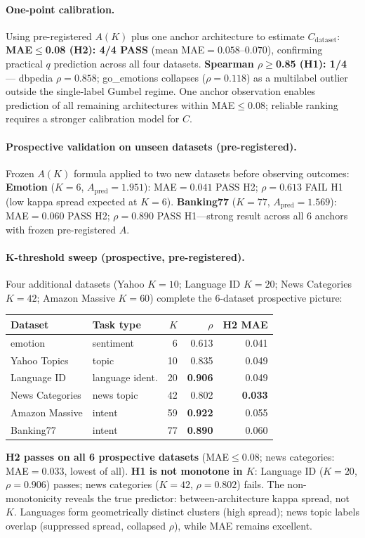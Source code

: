 \documentclass{article}
\begin{document}
\paragraph{One-point calibration.}
Using pre-registered $A(K)$ plus one anchor architecture to estimate $C_\mathrm{dataset}$:
\textbf{MAE$\leq$0.08 (H2): 4/4 PASS} (mean MAE$=0.058$--$0.070$), confirming practical $q$ prediction across all four datasets.
\textbf{Spearman $\rho\geq$0.85 (H1): 1/4} --- dbpedia $\rho=0.858$; go\_emotions collapses ($\rho=0.118$) as a multilabel outlier outside the single-label Gumbel regime.
One anchor observation enables prediction of all remaining architectures within MAE$\leq$0.08; reliable ranking requires a stronger calibration model for $C$.

\paragraph{Prospective validation on unseen datasets (pre-registered).}
Frozen $A(K)$ formula applied to two new datasets before observing outcomes:
\textbf{Emotion} ($K=6$, $A_\mathrm{pred}=1.951$): MAE$=0.041$ PASS H2; $\rho=0.613$ FAIL H1 (low kappa spread expected at $K=6$).
\textbf{Banking77} ($K=77$, $A_\mathrm{pred}=1.569$): MAE$=0.060$ PASS H2; $\rho=0.890$ PASS H1---strong result across all 6 anchors with frozen pre-registered $A$.

\paragraph{K-threshold sweep (prospective, pre-registered).}
Four additional datasets (Yahoo $K=10$; Language ID $K=20$; News Categories $K=42$; Amazon Massive $K=60$) complete the 6-dataset prospective picture:
\begin{center}
\begin{tabular}{llrrr}
\toprule
Dataset & Task type & $K$ & $\rho$ & H2 MAE \\
\midrule
emotion        & sentiment      & 6  & 0.613 & 0.041 \\
Yahoo Topics   & topic          & 10 & 0.835 & 0.049 \\
Language ID    & language ident.& 20 & \textbf{0.906} & 0.049 \\
News Categories& news topic     & 42 & 0.802 & \textbf{0.033} \\
Amazon Massive & intent         & 59 & \textbf{0.922} & 0.055 \\
Banking77      & intent         & 77 & \textbf{0.890} & 0.060 \\
\bottomrule
\end{tabular}
\end{center}
\textbf{H2 passes on all 6 prospective datasets} (MAE$\leq$0.08; news categories: MAE$=0.033$, lowest of all).
\textbf{H1 is not monotone in $K$}: Language ID ($K=20$, $\rho=0.906$) passes; news categories ($K=42$, $\rho=0.802$) fails.
The non-monotonicity reveals the true predictor: between-architecture kappa spread, not $K$.
Languages form geometrically distinct clusters (high spread); news topic labels overlap (suppressed spread, collapsed $\rho$), while MAE remains excellent.
\end{document}
